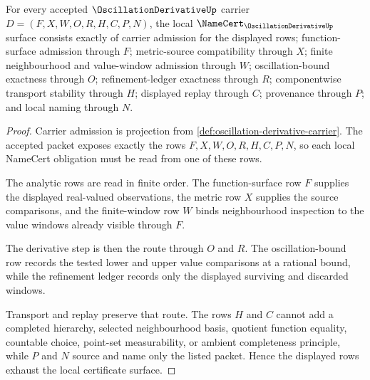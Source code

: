 \begin{theorem}
\label{thm:oscillation-derivative-namecert-obligations}
For every accepted $\OscillationDerivativeUp$ carrier $D=(F,X,W,O,R,H,C,P,N)$, the local $\NameCert_{\OscillationDerivativeUp}$ surface consists exactly of carrier admission for the displayed rows; function-surface admission through $F$; metric-source compatibility through $X$; finite neighbourhood and value-window admission through $W$; oscillation-bound exactness through $O$; refinement-ledger exactness through $R$; componentwise transport stability through $H$; displayed replay through $C$; provenance through $P$; and local naming through $N$.
\end{theorem}
\begin{proof}
Carrier admission is projection from \autoref{def:oscillation-derivative-carrier}. The accepted packet exposes exactly the rows $F,X,W,O,R,H,C,P,N$, so each local NameCert obligation must be read from one of these rows.

The analytic rows are read in finite order. The function-surface row $F$ supplies the displayed real-valued observations, the metric row $X$ supplies the source comparisons, and the finite-window row $W$ binds neighbourhood inspection to the value windows already visible through $F$.

The derivative step is then the route through $O$ and $R$. The oscillation-bound row records the tested lower and upper value comparisons at a rational bound, while the refinement ledger records only the displayed surviving and discarded windows.

Transport and replay preserve that route. The rows $H$ and $C$ cannot add a completed hierarchy, selected neighbourhood basis, quotient function equality, countable choice, point-set measurability, or ambient completeness principle, while $P$ and $N$ source and name only the listed packet. Hence the displayed rows exhaust the local certificate surface.
\end{proof}

